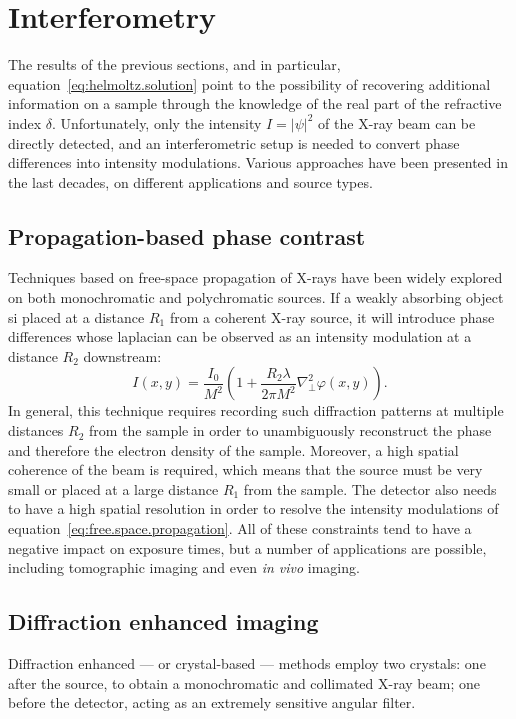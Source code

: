 \section{Interferometry}

The results of the previous sections, and in particular,
equation~\eqref{eq:helmoltz.solution} point to the possibility of recovering
additional information on a sample through the knowledge of the real part of
the refractive index $\delta$. Unfortunately, only the intensity $I =
|\psi|^2$ of the X-ray beam can be directly detected, and an interferometric
setup is needed to convert phase differences into intensity modulations.
Various approaches have been presented in the last decades, on different
applications and source types.

\subsection{Propagation-based phase contrast}
Techniques based on free-space propagation of X-rays have been widely
explored on both monochromatic and polychromatic sources. If a weakly
absorbing object si placed at a distance $R_1$ from a coherent X-ray source,
it will introduce phase differences whose laplacian can be observed as an
intensity modulation at a distance $R_2$ downstream:
\begin{equation}
    I(x, y) = \frac{I_0}{M^2}\left(1 + \frac{R_2\lambda}{2\pi M^2}\nabla_\perp^2
    \varphi(x, y)\right).
    \label{eq:free.space.propagation}
\end{equation}
In general, this technique requires recording such diffraction patterns at
multiple distances $R_2$ from the sample in order to unambiguously
reconstruct the phase and therefore the electron density of the sample.
Moreover, a high spatial coherence of the beam is required, which means
that the source must be very small or placed at a large distance $R_1$ from
the sample. The detector also needs to have a high spatial resolution in
order to resolve the intensity modulations of
equation~\eqref{eq:free.space.propagation}. All of these constraints tend to
have a negative impact on exposure times, but a number of applications are
possible, including tomographic imaging and even \emph{in vivo} imaging.

\subsection{Diffraction enhanced imaging}
Diffraction enhanced --- or crystal-based --- methods employ two crystals:
one after the source, to obtain a monochromatic and collimated X-ray beam;
one before the detector, acting as an extremely sensitive angular filter.

